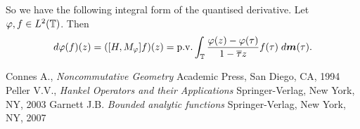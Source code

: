 \documentclass{unswmaths}
\begin{document}
So we have the following integral form of the quantised derivative. Let $\varphi,f \in L^2(\mathbb{T})$.
Then
\begin{equation*}
    d\varphi(f)(z) = ([H,M_\varphi]f)(z) = \mathrm{p.v.}\int_{\mathbb{T}} \frac{\varphi(z)-\varphi(\tau)}{1-\overline{\tau}z}f(\tau)\;d\boldsymbol{m}(\tau).
\end{equation*}

\begin{thebibliography}{9}
     Connes A., 
    \emph{Noncommutative Geometry}
     Academic Press, 
     San Diego, 
     CA, 
     1994
    Peller V.V.,
    \emph{Hankel Operators and their Applications}
    Springer-Verlag,
    New York, 
    NY,
    2003    
    Garnett J.B.
    \emph{Bounded analytic functions}
    Springer-Verlag,
    New York,
    NY,
    2007    
\end{thebibliography}
\end{document}
